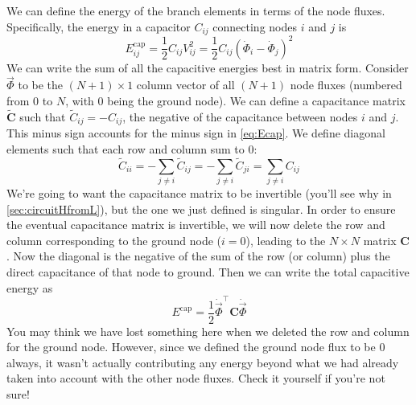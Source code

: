 We can define the energy of the branch elements in terms of the node fluxes. Specifically, the energy in a capacitor $C_{ij}$ connecting nodes $i$ and $j$ is %
\begin{equation}
\label{eq:Ecap}
    E_{ij}^\mathrm{cap} = \frac{1}{2}C_{ij}V_{ij}^2 = \frac{1}{2}C_{ij}(\dot{\Phi}_i - \dot{\Phi}_j)^2
\end{equation}
We can write the sum of all the capacitive energies best in matrix form. Consider $\vec{\Phi}$ to be the $(N+1)\times 1$ column vector of all $(N+1)$ node fluxes (numbered from 0 to $N$, with 0 being the ground node). We can define a capacitance matrix $\mathbf{\tilde{C}}$ such that $\tilde{C}_{ij} = -C_{ij}$, the negative of the capacitance between nodes $i$ and $j$. This minus sign accounts for the minus sign in \cref{eq:Ecap}. We define diagonal elements such that each row and column sum to 0: 
\begin{equation*}
\tilde{C}_{ii} = -\sum_{j\neq i} \tilde{C}_{ij} = -\sum_{j\neq i} \tilde{C}_{ji} = \sum_{j\neq i} C_{ij}
\end{equation*}
We're going to want the capacitance matrix to be invertible (you'll see why in \cref{sec:circuitHfromL}), but the one we just defined is singular. In order to ensure the eventual capacitance matrix is invertible, we will now delete the row and column corresponding to the ground node ($i=0$), leading to the $N \times N$ matrix $\mathbf{C}$. Now the diagonal is the negative of the sum of the row (or column) plus the direct capacitance of that node to ground. Then we can write the total capacitive energy as
\begin{equation}
    \label{eq:matrixEcapflux}
    E^\mathrm{cap} = \frac{1}{2}\dot{\vec{\Phi}}^\top\mathbf{C}\dot{\vec{\Phi}}
\end{equation}
You may think we have lost something here when we deleted the row and column for the ground node. However, since we defined the ground node flux to be 0 always, it wasn't actually contributing any energy beyond what we had already taken into account with the other node fluxes. Check it yourself if you're not sure! 

